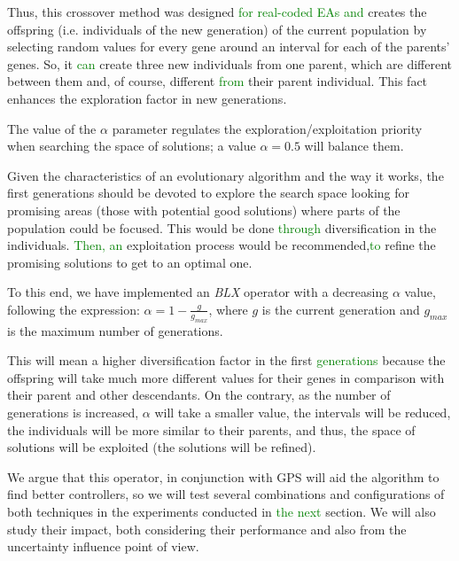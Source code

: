 \documentclass[10pt,journal,compsoc]{IEEEtran}
\begin{document}
Thus, this crossover method was designed \textcolor{green}{for real-coded EAs \cite{blx2008} and} creates the offspring (i.e. individuals of the new generation) of the current population by selecting random values for every gene around an interval for each of the parents' genes. So, it \textcolor{green}{can} create three new individuals from one parent, which are different between them and, of course, different \textcolor{green}{from} their parent individual. This fact enhances the exploration factor in new generations.

The value of the $\alpha$ parameter regulates the exploration/exploitation priority when searching the space of solutions; a value $\alpha = 0.5$ will balance them.

Given the characteristics of an evolutionary algorithm and the way it works, the first generations should be devoted to explore the search space looking for promising areas (those with potential good solutions) where parts of the population could be focused. This would be done \textcolor{green}{through} diversification in the individuals. \textcolor{green}{Then, an} exploitation process would be recommended,\textcolor{green}{to} refine the promising solutions to get to an optimal one.

To this end, we have implemented an \textit{BLX} operator with a decreasing $\alpha$ value, following
the expression: \mbox{$\alpha =1-\frac{g}{g_{max}}$}, where $g$ is the
current generation and $g_{max}$ is the maximum number of generations.

This will mean a higher diversification factor in the first \textcolor{green}{generations} because the offspring will take much more different values for their genes in comparison with their parent and other descendants. %
On the contrary, as the number of generations is increased, $\alpha$ will take a smaller value, the intervals will be reduced, the individuals will be more similar to their parents, and thus, the space of solutions will be exploited (the solutions will be refined).

We argue that this operator, in conjunction with GPS will aid the
algorithm to find better controllers, so we will test several
combinations and configurations of both techniques in the experiments
conducted in \textcolor{green}{the next} section. We will also study their impact, both considering their performance and also from the uncertainty influence point of view. 
\end{document}
